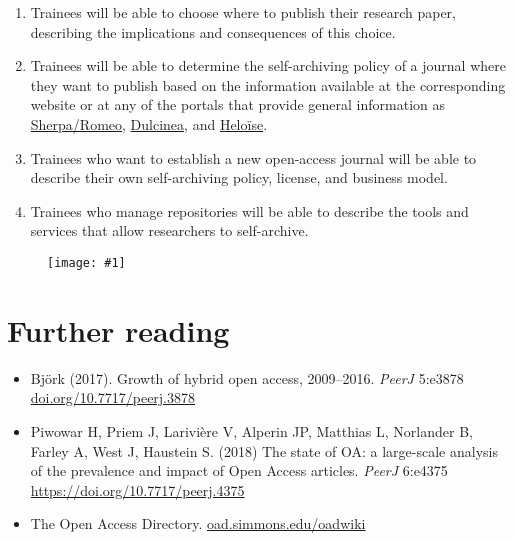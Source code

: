 \documentclass{article}
\newlength{\imgwidth}
\newcommand\scaledgraphics[2]{%
                
\settowidth{\imgwidth}{\texttt{[image: \#1]}}%
                
\setlength{\imgwidth}{\minof{\imgwidth}{#2\textwidth}}%
                
\texttt{[image: \#1]}%
                
}
\begin{document}
\begin{enumerate}
\item Trainees will be able to choose where to publish their research paper, describing the implications and consequences of this choice.


\item Trainees will be able to determine the self-archiving policy of a journal where they want to publish based on the information available at the corresponding website or at any of the portals that provide general information as \href{http://www.sherpa.ac.uk/romeo/}{Sherpa/Romeo}, \href{http://www.accesoabierto.net/dulcinea/}{Dulcinea}, and \href{https://heloise.ccsd.cnrs.fr/}{Heloïse}.


\item Trainees who want to establish a new open-access journal will be able to describe their own self-archiving policy, license, and business model.


\item Trainees who manage repositories will be able to describe the tools and services that allow researchers to self-archive.


\end{enumerate}
\begin{figure}
\scaledgraphics{28184297-5028-4ac9-bc5f-7a459edf50cf.png}{1}
\label{F12112101}
\end{figure}


\section{Further reading}\label{further-reading}


\begin{itemize}
\item Björk (2017). Growth of hybrid open access, 2009–2016. \emph{PeerJ} 5:e3878 \href{https://doi.org/10.7717/peerj.3878}{doi.org/10.7717/peerj.3878}


\item Piwowar H, Priem J, Larivière V, Alperin JP, Matthias L, Norlander B, Farley A, West J, Haustein S. (2018) The state of OA: a large-scale analysis of the prevalence and impact of Open Access articles. \emph{PeerJ} 6:e4375 \href{https://doi.org/10.7717/peerj.4375}{https://doi.org/10.7717/peerj.4375}


\item The Open Access Directory. \href{http://oad.simmons.edu/oadwiki/Main_Page}{oad.simmons.edu/oadwiki}


\end{itemize}
\end{document}

